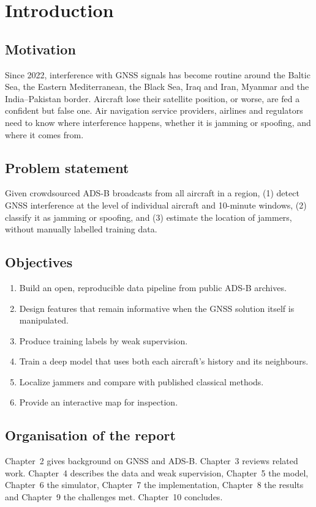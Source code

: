 \documentclass[12pt,a4paper,oneside]{report}
\begin{document}
\tableofcontents
\listoffigures
\listoftables

\chapter{Introduction}
\section{Motivation}
Since 2022, interference with GNSS signals has become routine around the Baltic Sea, the Eastern Mediterranean, the Black
Sea, Iraq and Iran, Myanmar and the India--Pakistan border. Aircraft lose their satellite position, or worse, are fed a
confident but false one. Air navigation service providers, airlines and regulators need to know where interference happens,
whether it is jamming or spoofing, and where it comes from.
\section{Problem statement}
Given crowdsourced ADS-B broadcasts from all aircraft in a region, (1) detect GNSS interference at the level of individual
aircraft and 10-minute windows, (2) classify it as jamming or spoofing, and (3) estimate the location of jammers, without
manually labelled training data.
\section{Objectives}
\begin{enumerate}
\item Build an open, reproducible data pipeline from public ADS-B archives.
\item Design features that remain informative when the GNSS solution itself is manipulated.
\item Produce training labels by weak supervision.
\item Train a deep model that uses both each aircraft's history and its neighbours.
\item Localize jammers and compare with published classical methods.
\item Provide an interactive map for inspection.
\end{enumerate}
\section{Organisation of the report}
Chapter~2 gives background on GNSS and ADS-B. Chapter~3 reviews related work. Chapter~4 describes the data and weak
supervision, Chapter~5 the model, Chapter~6 the simulator, Chapter~7 the implementation, Chapter~8 the results and
Chapter~9 the challenges met. Chapter~10 concludes.
\end{document}
